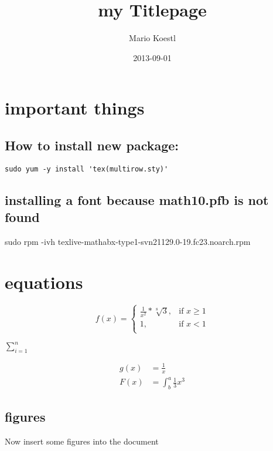 \documentclass{article}
\title{my Titlepage}
\date{2013-09-01}
\author{Mario Koestl}
\begin{document}
\maketitle
\newpage
{} %

\section{important things}

\subsection{How to install new package:}
\begin{lstlisting}
sudo yum -y install 'tex(multirow.sty)'
\end{lstlisting}


\subsection{installing a font because math10.pfb is not found}
sudo rpm -ivh texlive-mathabx-type1-svn21129.0-19.fc23.noarch.rpm 



\section{equations}

\begin{equation}
f(x) = 
\begin{cases}
\frac{1}{x^2} * \sqrt[8]{3},& \text{if } x\geq 1\\
1, & \text{if } x < 1\\
\end{cases}
\end{equation}

$\sum^n_{i=1}$

\begin{align*}
  g(x) &= \frac{1}{x}\\
  F(x) &= \int^a_b \frac{1}{3}x^3
\end{align*}


\subsection{figures}
Now insert some figures into the document
\end{document}
